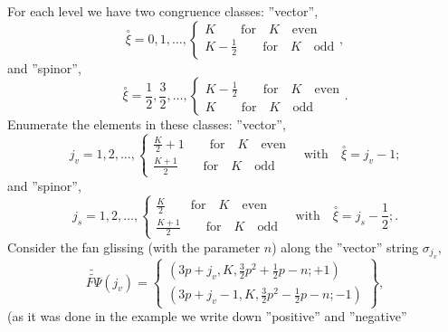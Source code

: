 \documentclass{article}
\begin{document}
For each level we have two congruence classes: ''vector'', 
\begin{equation*}
\overset{\circ }{\xi }=0,1,\ldots ,\left\{ 
\begin{array}{c}
K\qquad \mathrm{for\quad }K\mathrm{\quad even} \\ 
K-\frac{1}{2}\qquad \mathrm{for\quad }K\mathrm{\quad odd}
\end{array}
\right. ,
\end{equation*}
and ''spinor'', 
\begin{equation*}
\overset{\circ }{\xi }=\frac{1}{2},\frac{3}{2},\ldots ,\left\{ 
\begin{array}{c}
K-\frac{1}{2}\qquad \mathrm{for\quad }K\mathrm{\quad even} \\ 
K\qquad \mathrm{for\quad }K\mathrm{\quad odd}
\end{array}
\right. .
\end{equation*}
Enumerate the elements in these classes: ''vector'', 
\begin{equation*}
j_{v}=1,2,\ldots ,\left\{ 
\begin{array}{c}
\frac{K}{2}+1\qquad \mathrm{for\quad }K\mathrm{\quad even} \\ 
\frac{K+1}{2}\qquad \mathrm{for\quad }K\mathrm{\quad odd}
\end{array}
\right. \quad \mathrm{with}\quad \overset{\circ }{\xi }=j_{v}-1;
\end{equation*}
and ''spinor'', 
\begin{equation*}
j_{s}=1,2,\ldots ,\left\{ 
\begin{array}{c}
\frac{K}{2}\qquad \mathrm{for\quad }K\mathrm{\quad even} \\ 
\frac{K+1}{2}\qquad \mathrm{for\quad }K\mathrm{\quad odd}
\end{array}
\right. \quad \mathrm{with}\quad \overset{\circ }{\xi }=j_{s}-\frac{1}{2};.
\end{equation*}
Consider the fan glissing (with the parameter $n$) along the ''vector''
string $\sigma _{j_{v}}$, 
\begin{equation*}
\widetilde{\widetilde{F\Psi }}\left( j_{v}\right) =\left\{ 
\begin{array}{c}
\left( 3p+j_{v},K,\frac{3}{2}p^{2}+\frac{1}{2}p-n;+1\right) \\ 
\left( 3p+j_{v}-1,K,\frac{3}{2}p^{2}-\frac{1}{2}p-n;-1\right)
\end{array}
\right\} ,
\end{equation*}
(as it was done in the example we write down ''positive'' and ''negative''
\end{document}
